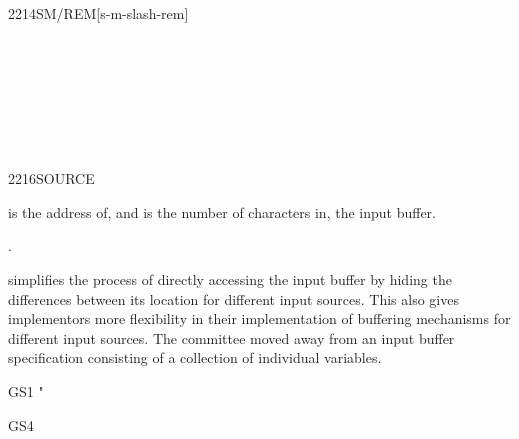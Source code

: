 \begin{worddef}{2214}{SM/REM}[s-m-slash-rem]
\begin{testing}
		 \\
		 \\
		 \\
		 \\
		 \\
		 \\
	\end{testing}
\end{worddef}

\vspace*{-1ex}
\begin{worddef}{2216}{SOURCE}
\item {}

	 is the address of, and  is the number of
	characters in, the input buffer.

\see {}.

	\begin{rationale} %
		 simplifies the process of directly accessing the
		input buffer by hiding the differences between its location
		for different input sources. This also gives implementors more
		flexibility in their implementation of buffering mechanisms
		for different input sources. The committee moved away from an
		input buffer specification consisting of a collection of
		individual variables.
	\end{rationale}

	\begin{testing} %
		\ttfamily
		\word{:} GS1  "  
			   \word{=} \word{Rfrom}  \word{=} \word{;} \\

		\word{:} GS4   \word{!}  \word{;} \\
	\end{testing}
\end{worddef}


